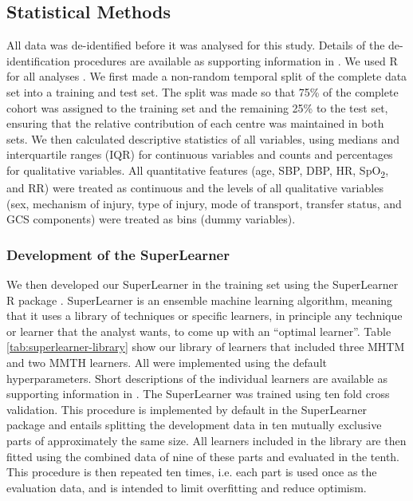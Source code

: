 \documentclass[10pt,letterpaper]{article}\usepackage[]{graphicx}\usepackage[]{color}
\begin{document}
\subsection*{Statistical Methods}
All data was de-identified before it was analysed for this study. Details of the
de-identification procedures are available as supporting information in
. We used R for all analyses \cite{R}. We first made a
non-random temporal split of the complete data set into a training and test
set. The split was made so that 75\% of the complete cohort was assigned to the
training set and the remaining 25\% to the test set, ensuring that the relative
contribution of each centre was maintained in both sets. We then calculated
descriptive statistics of all variables, using medians and interquartile ranges
(IQR) for continuous variables and counts and percentages for qualitative
variables. All quantitative features (age, SBP, DBP, HR, SpO\textsubscript{2},
and RR) were treated as continuous and the levels of all qualitative variables
(sex, mechanism of injury, type of injury, mode of transport, transfer status,
and GCS components) were treated as bins (dummy variables).

\subsubsection*{Development of the SuperLearner}
We then developed our SuperLearner in the training set using the SuperLearner R
package \cite{SuperLearner}. SuperLearner is an ensemble machine learning
algorithm, meaning that it uses a library of techniques or specific learners, in
principle any technique or learner that the analyst wants, to come up with an
``optimal learner''. Table \ref{tab:superlearner-library} show our library of
learners that included three MHTM and two MMTH learners. All were implemented
using the default hyperparameters. Short descriptions of the individual learners
are available as supporting information in . The SuperLearner
was trained using ten fold cross validation. This procedure is implemented by
default in the SuperLearner package and entails splitting the development data
in ten mutually exclusive parts of approximately the same size. All learners
included in the library are then fitted using the combined data of nine of these
parts and evaluated in the tenth. This procedure is then repeated ten times,
i.e. each part is used once as the evaluation data, and is intended to limit
overfitting and reduce optimism.
\end{document}
